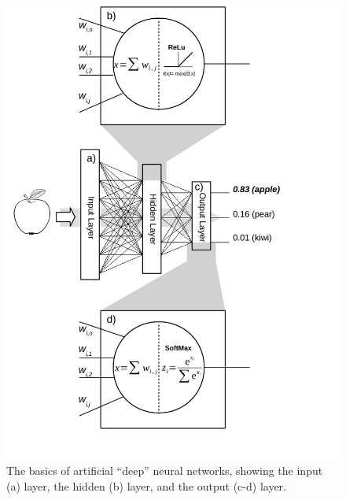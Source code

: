 \documentclass[techrep,english]{ipsj} %
\begin{document}
\begin{figure}[ht]
  \centering
  \includegraphics[width=\linewidth]{example_ann-crop.pdf}
  \caption{The basics of artificial ``deep'' neural networks, showing the input (a) layer, the hidden (b) layer, and the output (c-d) layer.}\label{fig:ann-example}
\end{figure}
\end{document}
